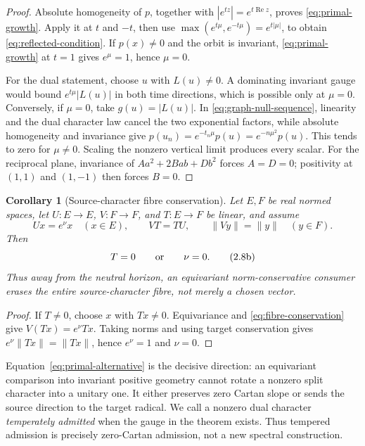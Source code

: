 \documentclass[11pt]{article}
\newtheorem{corollary}[theorem]{Corollary}
\theoremstyle{definition}
\theoremstyle{remark}
\newcommand{\Rea}{\operatorname{Re}}
\begin{document}
\begin{proof}
Absolute homogeneity of \(p\), together with
\(|e^{tz}|=e^{t\Rea z}\), proves \eqref{eq:primal-growth}.  Apply it at
\(t\) and \(-t\), then use
\(\max(e^{t\mu},e^{-t\mu})=e^{t|\mu|}\), to obtain
\eqref{eq:reflected-condition}.  If \(p(x)\ne0\) and the orbit is
invariant, \eqref{eq:primal-growth} at \(t=1\) gives \(e^\mu=1\), hence
\(\mu=0\).

For the dual statement, choose \(u\) with \(L(u)\ne0\).  A dominating
invariant gauge would bound \(e^{t\mu}|L(u)|\) in both time directions,
which is possible only at \(\mu=0\).  Conversely, if \(\mu=0\), take
\(g(u)=|L(u)|\).  In \eqref{eq:graph-null-sequence}, linearity and the
dual character law cancel the two exponential factors, while absolute
homogeneity and invariance give
\(p(u_n)=e^{-t_n\mu}p(u)=e^{-n\mu^2}p(u)\).  This tends to zero for
\(\mu\ne0\).  Scaling the nonzero vertical limit produces every scalar.
For the reciprocal plane, invariance of
\(Aa^2+2Bab+Db^2\) forces \(A=D=0\); positivity at \((1,1)\) and
\((1,-1)\) then forces \(B=0\).
\end{proof}

\begin{corollary}[Source-character fibre conservation]
\label{cor:source-character-fibre}
Let \(E,F\) be real normed spaces, let \(U:E\to E\), \(V:F\to F\), and
\(T:E\to F\) be linear, and assume
\[
 Ux=e^\nu x\quad(x\in E),\qquad VT=TU,
 \qquad \|Vy\|=\|y\|\quad(y\in F).
\tag{2.8a}\label{eq:fibre-conservation}
\]
Then
\[
                         T=0\qquad\hbox{or}\qquad\nu=0.
\tag{2.8b}\label{eq:fibre-dichotomy}
\]
Thus away from the neutral horizon, an equivariant norm-conservative
consumer erases the entire source-character fibre, not merely a chosen
vector.
\end{corollary}

\begin{proof}
If \(T\ne0\), choose \(x\) with \(Tx\ne0\).  Equivariance and
\eqref{eq:fibre-conservation} give \(V(Tx)=e^\nu Tx\).  Taking norms and
using target conservation gives \(e^\nu\|Tx\|=\|Tx\|\), hence
\(e^\nu=1\) and \(\nu=0\).
\end{proof}

Equation~\eqref{eq:primal-alternative} is the decisive direction: an
equivariant comparison into invariant positive geometry cannot rotate a
nonzero split character into a unitary one.  It either preserves zero
Cartan slope or sends the source direction to the target radical.  We call
a nonzero dual character \emph{temperately admitted} when the gauge in the
theorem exists.  Thus tempered admission is precisely zero-Cartan
admission, not a new spectral construction.
\end{document}
